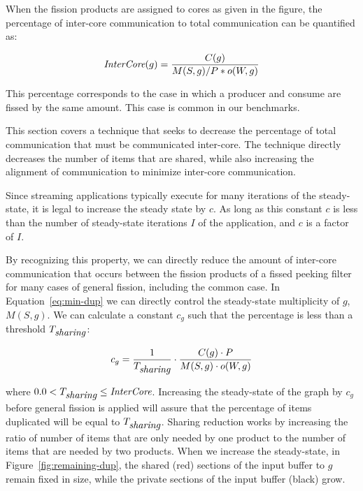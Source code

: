 When the fission products are assigned to
cores as given in the figure, the percentage of inter-core
communication to total communication can be quantified as:

\begin{equation}
\label{eq:min-dup}
\mt{InterCore}(g) = \frac{C(g)}{M(S,g) / P * o(W, g)}
\end{equation}

\noindent This percentage corresponds to the case in which a
producer and consume are fissed by the same amount.  This case is
common in our benchmarks.

This section covers a technique that seeks to decrease the percentage
of total communication that must be communicated inter-core.  The
technique directly decreases the number of items that are shared,
while also increasing the alignment of communication to minimize
inter-core communication.

Since streaming applications typically execute for many iterations of
the steady-state, it is legal to increase the steady state by $c$.  As
long as this constant $c$ is less than the number of steady-state
iterations $I$ of the application, and $c$ is a factor of $I$.

By recognizing this property, we can directly reduce the amount of
inter-core communication that occurs between the fission products of a
fissed peeking filter for many cases of general fission, including the
common case.  In Equation~\ref{eq:min-dup} we can directly control the
steady-state multiplicity of $g$, $M(S,g)$.  We can calculate a
constant $c_g$ such that the percentage is less than a threshold
$T_{\mbox{\it sharing}}$:

\begin{equation}
\label{eq:ic-thresh}
c_g = \frac{1}{T_{\mt{sharing}}} \cdot \frac{C(g) \cdot P}{M(S,g) \cdot o(W,g)}
\end{equation}

\noindent where $0.0 < T_{\mbox{\it sharing}} \le
\mbox{\it InterCore}$. Increasing the steady-state of the graph by $c_g$
before general fission is applied will assure that the percentage of
items duplicated will be equal to $T_{\mbox{\it sharing}}$.  Sharing
reduction works by increasing the ratio of number of items that are
only needed by one product to the number of items that are needed by
two products.  When we increase the steady-state, in
Figure~\ref{fig:remaining-dup}, the shared (red) sections of the input
buffer to $g$ remain fixed in size, while the private sections of the
input buffer (black) grow.

